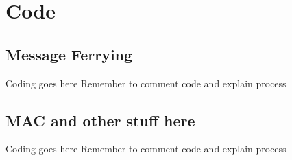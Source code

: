 \chapter{Code} 

\section{Message Ferrying}

Coding goes here 
Remember to comment code and explain process

\section{MAC and other stuff here}

Coding goes here 
Remember to comment code and explain process